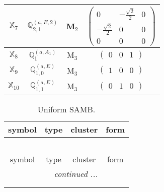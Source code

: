 \documentclass[fleqn,10pt,landscape]{article}
\begin{document}
\begin{itemize}
\begin{center}
\begin{longtable}{c|c|c|c}
$ \mathbb{X}_{7} $ & $\mathbb{Q}_{2,1}^{(a,E,2)}$ & M$_{2}$ & $\begin{pmatrix} 0 & - \frac{\sqrt{2}}{2} & 0 \\ - \frac{\sqrt{2}}{2} & 0 & 0 \\ 0 & 0 & 0 \end{pmatrix}$ \\ \hline
$ \mathbb{X}_{8} $ & $\mathbb{Q}_{1}^{(a,A_{1})}$ & M$_{3}$ & $\begin{pmatrix} 0 & 0 & 1 \end{pmatrix}$ \\
$ \mathbb{X}_{9} $ & $\mathbb{Q}_{1,0}^{(a,E)}$ & M$_{3}$ & $\begin{pmatrix} 1 & 0 & 0 \end{pmatrix}$ \\
$ \mathbb{X}_{10} $ & $\mathbb{Q}_{1,1}^{(a,E)}$ & M$_{3}$ & $\begin{pmatrix} 0 & 1 & 0 \end{pmatrix}$ \\
\end{longtable}
\end{center}
\begin{center}
\renewcommand{\arraystretch}{1.3}
\begin{longtable}{c|c|c|c}
\caption{Uniform SAMB.}
 \\
 \hline \hline
symbol & type & cluster & form \\ \hline \endfirsthead

\multicolumn{3}{l}{\tablename\ \thetable{}} \\
 \hline \hline
symbol & type & cluster & form \\ \hline \endhead

 \hline \hline
\multicolumn{3}{r}{\footnotesize\it continued ...} \\ \endfoot

 \hline \hline
\multicolumn{3}{r}{} \\ \endlastfoot


\end{longtable}
\end{center}
\end{itemize}
\end{document}
